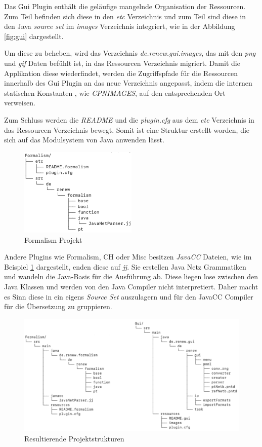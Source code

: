	Das Gui Plugin enthält die geläufige mangelnde Organisation der Ressourcen. Zum Teil befinden sich diese in den \textit{etc} Verzeichnis und zum Teil sind diese in den Java \textit{source set} im \textit{images} Verzeichnis integriert, wie in der Abbildung \ref{fig:gui} dargestellt.


	Um diese zu beheben, wird das Verzeichnis \textit{de.renew.gui.images}, das mit den \textit{png} und \textit{gif} Daten befühlt ist, in das Ressourcen Verzeichnis migriert. Damit die Applikation diese wiederfindet, werden die Zugriffspfade für die Ressourcen innerhalb des Gui Plugin an das neue Verzeichnis angepasst, indem die internen statischen Konstanten , wie \textit{CPNIMAGES}, auf den entsprechenden Ort verweisen. 


	Zum Schluss werden die \textit{README} und die \textit{plugin.cfg}  aus dem \textit{etc} Verzeichnis in das Ressourcen Verzeichnis bewegt. Somit ist eine Struktur erstellt worden, die sich auf das Modulsystem von Java anwenden lässt. \bigbreak

	\begin{figure}[h!]
	  \centering
	  \includegraphics[width=0.5\textwidth]{material/images/formalism_plugin.png}
	  \caption{Formalism Projekt}
	  \label{fig:formalism}
	\end{figure}

	Andere Plugins wie Formalism, CH oder Misc besitzen \textit{JavaCC} Dateien, wie im Beispiel \ref{fig:formalism} dargestellt, enden diese auf \textit{jj}. Sie erstellen Java Netz Grammatiken und wandeln die Java-Basis für die Ausführung ab. Diese liegen lose zwischen den Java Klassen und werden von den Java Compiler nicht interpretiert. Daher macht es Sinn diese in ein eigens \textit{Source Set} auszulagern und für den JavaCC Compiler für die Übersetzung zu gruppieren.

	\begin{figure}[h!]
	  \centering
	  \includegraphics[width=\textwidth]{material/images/form-gui.png}
	  \caption{Resultierende Projektstrukturen}
	  \label{fig:resultStr}
	\end{figure}

